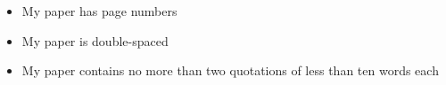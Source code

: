 \documentclass[11pt]{article}
\begin{document}
\vspace{0.5cm}

\begin{minipage}{0.135\textwidth}
\end{minipage}
\begin{minipage}{0.8\textwidth}
\hline\vspace{0.25cm}
\begin{itemize}\itemsep-0.25em
	\item My paper has page numbers
\end{itemize}	
\hline\vspace{0.25cm} 
\end{minipage}

\vspace{0.5cm}

\begin{minipage}{0.135\textwidth}
\end{minipage}
\begin{minipage}{0.8\textwidth}
\hline\vspace{0.25cm}
\begin{itemize}\itemsep-0.25em
	\item My paper is double-spaced
\end{itemize}	
\hline\vspace{0.25cm} 
\end{minipage}

\vspace{0.5cm}

\begin{minipage}{0.135\textwidth}
\end{minipage}
\begin{minipage}{0.8\textwidth}
\hline\vspace{0.25cm}
\begin{itemize}\itemsep-0.25em
	\item My paper contains no more than two quotations of less than ten words each
\end{itemize}	
\hline\vspace{0.25cm} 
\end{minipage}
\end{document}

